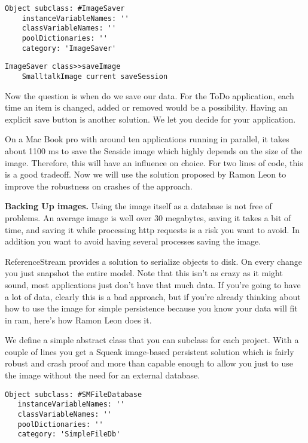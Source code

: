 \documentclass[a4paper,10pt,twoside]{book}
\begin{document}
\begin{lstlisting}
Object subclass: #ImageSaver
    instanceVariableNames: ''
    classVariableNames: ''
    poolDictionaries: ''
    category: 'ImageSaver'
\end{lstlisting}

\begin{lstlisting}
ImageSaver class>>saveImage
    SmalltalkImage current saveSession
\end{lstlisting}

Now the question is when do we save our data. For the ToDo application, each time an item is changed, added or removed would be a possibility. Having an explicit save button is another solution. We let you decide for your application.

On a Mac Book pro with around ten applications running in parallel, it takes about 1100 ms to save the Seaside image which highly depends on the size of the image. Therefore, this will have an influence on choice. For two lines of code, this is a good tradeoff. Now we will use the solution proposed by Ramon Leon to improve the robustness on crashes of the approach.

\textbf{Backing Up images.} Using the image itself as a database is not free of problems. An average image is well over 30 megabytes, saving it takes a bit of time, and saving it while processing http requests is a risk you want to avoid. In addition you want to avoid having several processes saving the image.

ReferenceStream provides a solution to serialize objects to disk. On every change you just snapshot the entire model. Note that this isn't as crazy as it might sound, most applications just don't have that much data. If you're going to have a lot of data, clearly this is a bad approach, but if you're already thinking about how to use the image for simple persistence because you know your data will fit in ram, here's how Ramon Leon does it.

We define a simple abstract class that you can subclass for each project. With a couple of lines you get a Squeak image-based persistent solution which is fairly robust and crash proof and more than capable enough to allow you just to use the image without the need for an external database.

\begin{lstlisting}
Object subclass: #SMFileDatabase
   instanceVariableNames: ''
   classVariableNames: ''
   poolDictionaries: ''
   category: 'SimpleFileDb'
\end{lstlisting}
\end{document}
